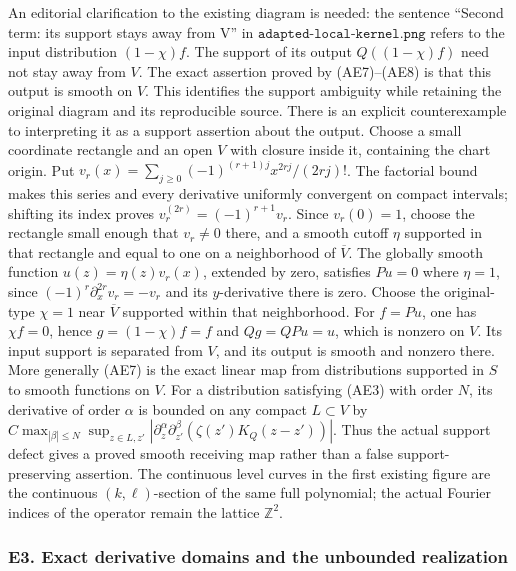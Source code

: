 \documentclass[
  11pt,
]{article}
\begin{document}
An editorial clarification to the existing diagram is needed: the
sentence ``Second term: its support stays away from V'' in
\(\texttt{adapted-local-kernel.png}\) refers to the input distribution
\((1-\chi)f\). The support of its output \(Q((1-\chi)f)\) need not stay
away from \(V\). The exact assertion proved by (AE7)--(AE8) is that this
output is smooth on \(V\). This identifies the support ambiguity while
retaining the original diagram and its reproducible source. There is an
explicit counterexample to interpreting it as a support assertion about
the output. Choose a small coordinate rectangle and an open \(V\) with
closure inside it, containing the chart origin. Put
\(v_r(x)=\sum_{j\geq0}(-1)^{(r+1)j}x^{2rj}/(2rj)!\). The factorial bound
makes this series and every derivative uniformly convergent on compact
intervals; shifting its index proves \(v_r^{(2r)}=(-1)^{r+1}v_r\). Since
\(v_r(0)=1\), choose the rectangle small enough that \(v_r\ne0\) there,
and a smooth cutoff \(\eta\) supported in that rectangle and equal to
one on a neighborhood of \(\overline V\). The globally smooth function
\(u(z)=\eta(z)v_r(x)\), extended by zero, satisfies \(Pu=0\) where
\(\eta=1\), since \((-1)^r\partial_x^{2r}v_r=-v_r\) and its
\(y\)-derivative there is zero. Choose the original-type \(\chi=1\) near
\(\overline V\) supported within that neighborhood. For \(f=Pu\), one
has \(\chi f=0\), hence \(g=(1-\chi)f=f\) and \(Qg=QPu=u\), which is
nonzero on \(V\). Its input support is separated from \(V\), and its
output is smooth and nonzero there. More generally (AE7) is the exact
linear map from distributions supported in \(S\) to smooth functions on
\(V\). For a distribution satisfying (AE3) with order \(N\), its
derivative of order \(\alpha\) is bounded on any compact \(L\subset V\)
by \(C\max_{|\beta|\leq N}\sup_{z\in L,z'}
|\partial_z^\alpha\partial_{z'}^\beta
(\zeta(z')K_Q(z-z'))|\). Thus the actual support defect gives a proved
smooth receiving map rather than a false support-preserving assertion.
The continuous level curves in the first existing figure are the
continuous \((k,\ell)\)-section of the same full polynomial; the actual
Fourier indices of the operator remain the lattice \(\mathbb Z^2\).

\subsubsection{E3. Exact derivative domains and the unbounded
realization}\label{e3.-exact-derivative-domains-and-the-unbounded-realization}
\end{document}

